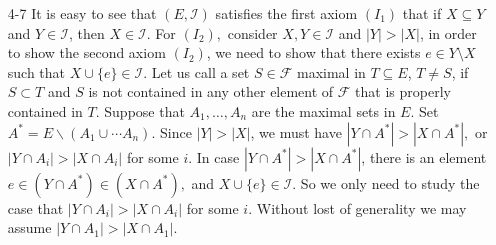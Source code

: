 \documentclass[12pt]{article}
\begin{document}
\begin{enumerate}

\item[4-7]
It is easy to see that $(E,\mathcal{I})$ satisfies the first axiom
$(I_1)$ that if $X\subseteq Y$ and $Y \in \mathcal{I}$, then $X \in
\mathcal{I}.$ For $(I_2),$ consider $X,Y \in \mathcal{I}$ and $|Y|>|X|$, in
order to show the second axiom $(I_2)$, we need to show that there
exists $e \in Y\setminus X$ such that $X \cup \{e\} \in \mathcal{I}.$ Let us call
a set $S \in \mathcal{F}$ maximal in $T \subseteq E$, $T\neq S$, if
$S\subset T$ and $S$ is not contained in any other element of
$\mathcal{F}$ that is properly contained in $T.$ Suppose that
$A_1,\ldots, A_n $ are the maximal sets in $E.$ Set $A^{*}=E
\backslash(A_1\cup \cdots A_n).$ Since $|Y|>|X|$, we must have
$|Y\cap A^{*}|>|X\cap A^{*}|,$ or $|Y\cap A_i|>|X\cap A_i|$ for some
$i.$ In case $|Y\cap A^{*}|>|X\cap A^{*}|$, there is an element $e
\in (Y\cap A^{*})\in (X\cap A^{*}),$ and $X \cup \{e\} \in \mathcal{I}.$
So we only need to study the case that $|Y\cap A_i|>|X\cap A_i|$ for
some $i.$ Without lost of generality we may assume $|Y\cap
A_1|>|X\cap A_1|.$


\end{enumerate}
\end{document}
